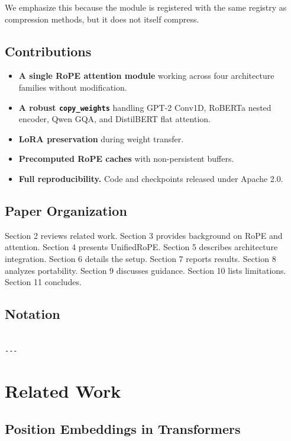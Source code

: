 We emphasize this because the module is registered with the same registry 
as compression methods, but it does not itself compress.

\subsection{Contributions}

\begin{itemize}
\item \textbf{A single RoPE attention module} working across four architecture
  families without modification.
\item \textbf{A robust \texttt{copy\_weights}} handling GPT-2 Conv1D, RoBERTa nested
  encoder, Qwen GQA, and DistilBERT flat attention.
\item \textbf{LoRA preservation} during weight transfer.
\item \textbf{Precomputed RoPE caches} with non-persistent buffers.
\item \textbf{Full reproducibility.} Code and checkpoints released under
  Apache 2.0.

\end{itemize}
\subsection{Paper Organization}

Section 2 reviews related work. Section 3 provides background on RoPE and 
attention. Section 4 presents UnifiedRoPE. Section 5 describes 
architecture integration. Section 6 details the setup. Section 7 reports 
results. Section 8 analyzes portability. Section 9 discusses guidance. 
Section 10 lists limitations. Section 11 concludes.



\subsection{Notation}

\begin{lstlisting}

---
\end{lstlisting}


\section{Related Work}

\subsection{Position Embeddings in Transformers}

